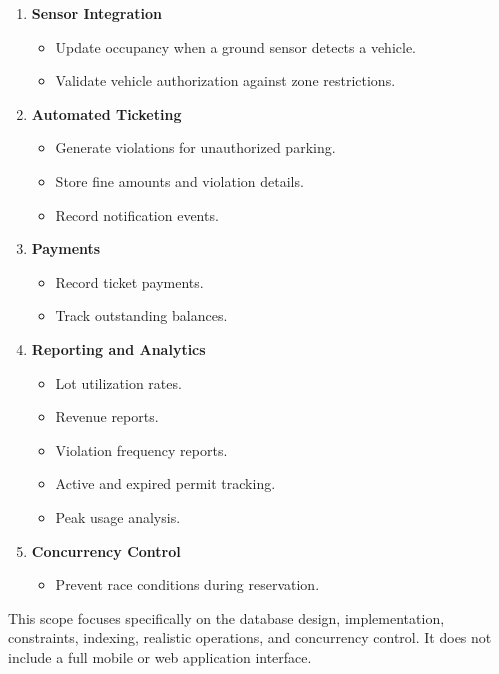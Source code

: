 \documentclass[12pt]{report}
\begin{document}
\begin{enumerate}
    \item \textbf{Sensor Integration}
    \begin{itemize}
        \item Update occupancy when a ground sensor detects a vehicle.
        \item Validate vehicle authorization against zone restrictions.
    \end{itemize}

    \item \textbf{Automated Ticketing}
    \begin{itemize}
        \item Generate violations for unauthorized parking.
        \item Store fine amounts and violation details.
        \item Record notification events.
    \end{itemize}

    \item \textbf{Payments}
    \begin{itemize}
        \item Record ticket payments.
        \item Track outstanding balances.
    \end{itemize}

    \item \textbf{Reporting and Analytics}
    \begin{itemize}
        \item Lot utilization rates.
        \item Revenue reports.
        \item Violation frequency reports.
        \item Active and expired permit tracking.
        \item Peak usage analysis.
    \end{itemize}

    \item \textbf{Concurrency Control}
    \begin{itemize}
        \item Prevent race conditions during reservation.
    \end{itemize}
\end{enumerate}

This scope focuses specifically on the database design, implementation, constraints, indexing, realistic operations, and concurrency control. It does not include a full mobile or web application interface.
\end{document}
